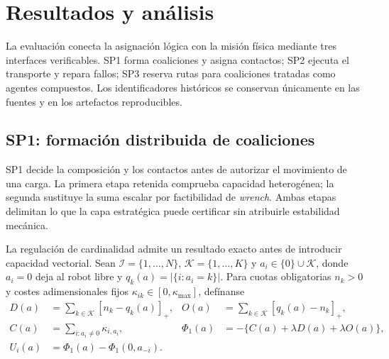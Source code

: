 \section{Resultados y análisis}
\label{sec:results}

La evaluación conecta la asignación lógica con la misión física mediante tres interfaces verificables. SP1 forma coaliciones y asigna contactos; SP2 ejecuta el transporte y repara fallos; SP3 reserva rutas para coaliciones tratadas como agentes compuestos. Los identificadores históricos se conservan únicamente en las fuentes y en los artefactos reproducibles.



\clearpage
\subsection{SP1: formación distribuida de coaliciones}
\label{subsec:sp1}

SP1 decide la composición y los contactos antes de autorizar el movimiento de una carga. La primera etapa retenida comprueba capacidad heterogénea; la segunda sustituye la suma escalar por factibilidad de \emph{wrench}. Ambas etapas delimitan lo que la capa estratégica puede certificar sin atribuirle estabilidad mecánica.

La regulación de cardinalidad admite un resultado exacto antes de introducir capacidad vectorial. Sean $\mathcal I=\{1,\ldots,N\}$, $\mathcal K=\{1,\ldots,K\}$ y $a_i\in\{0\}\cup\mathcal K$, donde $a_i=0$ deja al robot libre y $q_k(a)=|\{i:a_i=k\}|$. Para cuotas obligatorias $n_k>0$ y costes adimensionales fijos $\kappa_{ik}\in[0,\kappa_{\max}]$, defínanse
\begin{equation}
 \begin{aligned}
 D(a)&=\sum_{k\in\mathcal K}[n_k-q_k(a)]_+,&
 O(a)&=\sum_{k\in\mathcal K}[q_k(a)-n_k]_+,\\
 C(a)&=\sum_{i:a_i\ne0}\kappa_{i,a_i},&
 \Phi_1(a)&=-\{C(a)+\lambda D(a)+\lambda O(a)\},\\
 U_i(a)&=\Phi_1(a)-\Phi_1(0,a_{-i}).
 \end{aligned}
 \label{eq:pre-sp1-quota-game}
\end{equation}

